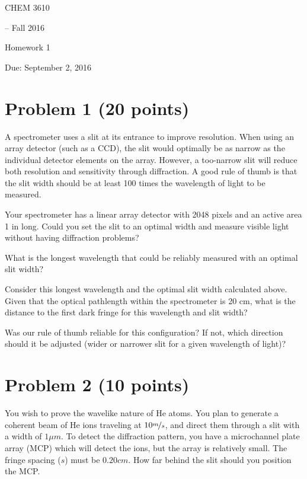 \documentclass[10pt, letterpaper]{memoir}
\begin{document}
	\begin{center}
		{\Huge CHEM 3610}
		{\LARGE-- Fall 2016
		
		Homework 1
		
		Due: September 2, 2016}
	\end{center}
		
	\section*{Problem 1 (20 points)}
	A spectrometer uses a slit at its entrance to improve resolution. When using an array detector (such as a CCD), the slit would optimally be as narrow as the individual detector elements on the array. However, a too-narrow slit will reduce both resolution and sensitivity through diffraction. A good rule of thumb is that the slit width should be at least 100 times the wavelength of light to be measured. 
	
	Your spectrometer has a linear array detector with 2048 pixels and an active area 1 in long. Could you set the slit to an optimal width and measure visible light without having diffraction problems?
	\vspace{10em}
	
	What is the longest wavelength that could be reliably measured with an optimal slit width?
	\vspace{10em}
	
	Consider this longest wavelength and the optimal slit width calculated above. Given that the optical pathlength within the spectrometer is 20 cm, what is the distance to the first dark fringe for this wavelength and slit width?
	\vspace{10em}
	
	Was our rule of thumb reliable for this configuration? If not, which direction should it be adjusted (wider or narrower slit for a given wavelength of light)?
	\vspace{10em}
	
	\section*{Problem 2  (10 points)}
	You wish to prove the wavelike nature of He atoms. You plan to generate a coherent beam of He ions traveling at $10\nicefrac{m}{s}$, and direct them through a slit with a width of $1 \mu m$. To detect the diffraction pattern, you have a microchannel plate array (MCP) which will detect the ions, but the array is relatively small. The fringe spacing ($s$) must be $0.20 cm$. How far behind the slit should you position the MCP.
	\vspace{16em}
	
\end{document}

